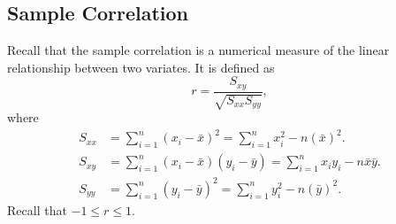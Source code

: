\documentclass[oneside]{book}\usepackage[]{graphicx}\usepackage[]{color}
\begin{document}
\subsection{Sample Correlation}
Recall that the sample correlation is a numerical measure of the linear relationship between two variates.
It is defined as
\[ r =\frac{S_{x y}}{\sqrt{S_{x x} S_{y y}}}, \]
where
\begin{align*}
    S_{x x} & =\sum_{i=1}^{n}(x_{i}-\bar{x})^{2}=\sum_{i=1}^{n} x_{i}^{2}-n(\bar{x})^{2}.                 \\
    S_{x y} & =\sum_{i=1}^{n}(x_{i}-\bar{x})(y_{i}-\bar{y})=\sum_{i=1}^{n} x_{i} y_{i}-n \bar{x} \bar{y}. \\
    S_{y y} & =\sum_{i=1}^{n}(y_{i}-\bar{y})^{2}=\sum_{i=1}^{n} y_{i}^{2}-n(\bar{y})^{2}.
\end{align*}
Recall that $ -1\le r\le 1 $.
\end{document}
